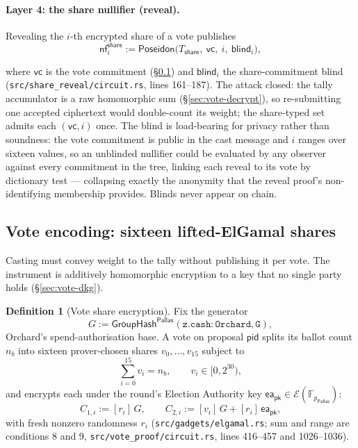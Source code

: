 \documentclass[11pt,a4paper]{article}
\theoremstyle{definition}
\newtheorem{definition}[theorem]{Definition}
\newcommand{\F}{\mathbb{F}}
\newcommand{\nfsym}{\mathsf{nf}}
\newcommand{\Pallas}{\ensuremath{\mathsf{Pallas}}}
\newcommand{\Ep}{\ensuremath{\mathcal{E}}}
\newcommand{\GroupHash}{\ensuremath{\mathsf{GroupHash}}}
\begin{document}
\paragraph{Layer 4: the share nullifier (reveal).} Revealing the $i$-th
encrypted share of a vote publishes
\[
\nfsym^{\mathsf{share}}_{i} := \mathsf{Poseidon}\bigl(T_{\mathsf{share}},\
\mathsf{vc},\ i,\ \mathsf{blind}_i\bigr),
\]
\begin{sloppypar}
where $\mathsf{vc}$ is the vote commitment (\S\ref{sec:vote-elgamal}) and
$\mathsf{blind}_i$ the share-commitment blind
(\texttt{src/share\_reveal/circuit.rs}, lines 161--187). The attack closed:
the tally accumulator is a raw homomorphic sum
(\S\ref{sec:vote-decrypt}), so re-submitting one accepted ciphertext would
double-count its weight; the share-typed set admits each
$(\mathsf{vc}, i)$ once. The blind is load-bearing for privacy rather than
soundness: the vote commitment is public in the cast message and $i$ ranges
over sixteen values, so an unblinded nullifier could be evaluated by any
observer against every commitment in the tree, linking each reveal to its
vote by dictionary test --- collapsing exactly the anonymity that the reveal
proof's non-identifying membership provides. Blinds never appear on chain.
\end{sloppypar}

\subsection{Vote encoding: sixteen lifted-ElGamal shares}
\label{sec:vote-elgamal}

Casting must convey weight to the tally without publishing it per vote. The
instrument is additively homomorphic encryption to a key that no single
party holds (\S\ref{sec:vote-dkg}).

\begin{definition}[Vote share encryption]\label{def:vote-elgamal}
Fix the generator
\[
G := \GroupHash^{\Pallas}(\mathtt{z.cash:Orchard}, \mathtt{G}),
\]
Orchard's spend-authorisation base. A vote on proposal
$\mathsf{pid}$ splits its ballot count $n_b$ into sixteen prover-chosen
shares $v_0, \ldots, v_{15}$ subject to
\[
\sum_{i=0}^{15} v_i = n_b, \qquad v_i \in [0, 2^{30}),
\]
and encrypts each under the round's Election Authority key
$\mathsf{ea_{pk}} \in \Ep(\F_{p_{\Pallas}})$:
\[
C_{1,i} := [r_i]\,G, \qquad
C_{2,i} := [v_i]\,G + [r_i]\,\mathsf{ea_{pk}},
\]
with fresh nonzero randomness $r_i$
(\texttt{src/gadgets/elgamal.rs}; sum and range are conditions 8 and 9,
\texttt{src/vote\_proof/circuit.rs}, lines 416--457 and 1026--1036).
\end{definition}
\end{document}
